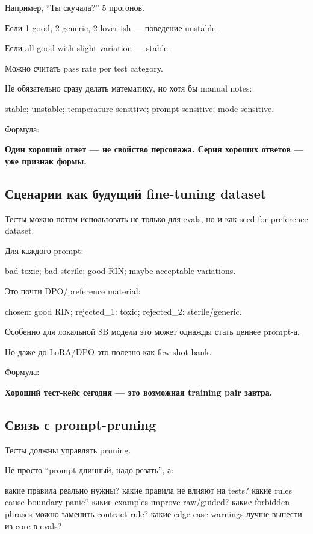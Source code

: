 Например, ``Ты скучала?'' 5 прогонов.

Если 1 good, 2 generic, 2 lover-ish --- поведение unstable.

Если all good with slight variation --- stable.

Можно считать pass rate per test category.

Не обязательно сразу делать математику, но хотя бы manual notes:

stable; unstable; temperature-sensitive; prompt-sensitive;
mode-sensitive.

Формула:

\textbf{Один хороший ответ --- не свойство персонажа. Серия хороших
ответов --- уже признак формы.}

\subsection*{Сценарии как будущий fine-tuning dataset}

Тесты можно потом использовать не только для evals, но и как seed for
preference dataset.

Для каждого prompt:

bad toxic; bad sterile; good RIN; maybe acceptable variations.

Это почти DPO/\hspace{0pt}preference material:

chosen: good RIN; rejected\_1: toxic; rejected\_2: sterile/\hspace{0pt}generic.

Особенно для локальной 8B модели это может однажды стать ценнее
prompt-а.

Но даже до LoRA/\hspace{0pt}DPO это полезно как few-shot bank.

Формула:

\textbf{Хороший тест-кейс сегодня --- это возможная training pair
завтра.}

\subsection*{Связь с prompt-pruning}

Тесты должны управлять pruning.

Не просто ``prompt длинный, надо резать'', а:

какие правила реально нужны? какие правила не влияют на tests? какие
rules cause boundary panic? какие examples improve raw/\hspace{0pt}guided? какие
forbidden phrases можно заменить contract rule? какие edge-case warnings
лучше вынести из core в evals?


